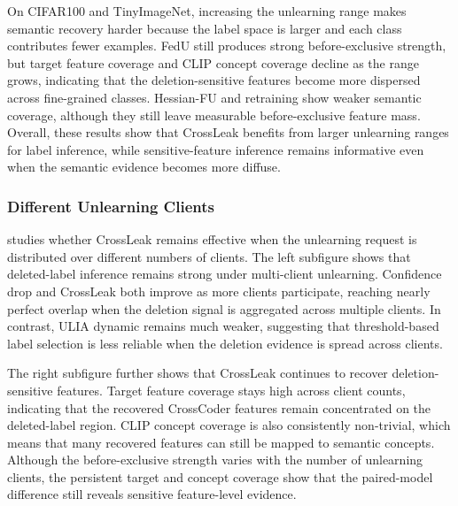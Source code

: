 On CIFAR100 and TinyImageNet, increasing the unlearning range makes semantic recovery harder because the label space is larger and each class contributes fewer examples. FedU still produces strong before-exclusive strength, but target feature coverage and CLIP concept coverage decline as the range grows, indicating that the deletion-sensitive features become more dispersed across fine-grained classes. Hessian-FU and retraining show weaker semantic coverage, although they still leave measurable before-exclusive feature mass. Overall, these results show that CrossLeak benefits from larger unlearning ranges for label inference, while sensitive-feature inference remains informative even when the semantic evidence becomes more diffuse.





\subsubsection{Different Unlearning Clients}





 studies whether CrossLeak remains effective when the unlearning request is distributed over different numbers of clients. The left subfigure shows that deleted-label inference remains strong under multi-client unlearning. Confidence drop and CrossLeak both improve as more clients participate, reaching nearly perfect overlap when the deletion signal is aggregated across multiple clients. In contrast, ULIA dynamic remains much weaker, suggesting that threshold-based label selection is less reliable when the deletion evidence is spread across clients.

The right subfigure further shows that CrossLeak continues to recover deletion-sensitive features. Target feature coverage stays high across client counts, indicating that the recovered CrossCoder features remain concentrated on the deleted-label region. CLIP concept coverage is also consistently non-trivial, which means that many recovered features can still be mapped to semantic concepts. Although the before-exclusive strength varies with the number of unlearning clients, the persistent target and concept coverage show that the paired-model difference still reveals sensitive feature-level evidence.






